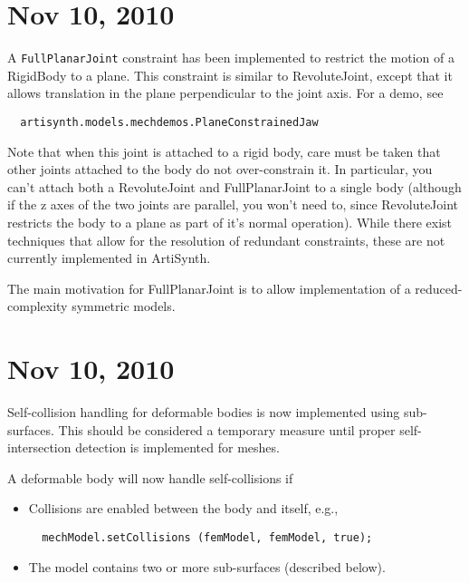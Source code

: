 \documentclass{article}
\begin{document}
\section*{Nov 10, 2010}

A {\tt FullPlanarJoint} constraint has been implemented to restrict the
motion of a RigidBody to a plane. This constraint is similar to
RevoluteJoint, except that it allows translation in the plane
perpendicular to the joint axis. For a demo, see

\begin{verbatim}
  artisynth.models.mechdemos.PlaneConstrainedJaw
\end{verbatim}

Note that when this joint is attached to a rigid body, care must be
taken that other joints attached to the body do not over-constrain it.
In particular, you can't attach both a RevoluteJoint and
FullPlanarJoint to a single body (although if the z axes of the
two joints are parallel, you won't need to, since RevoluteJoint
restricts the body to a plane as part of it's normal operation).
While there exist techniques that allow for the resolution of
redundant constraints, these are not currently implemented in
ArtiSynth.

The main motivation for FullPlanarJoint is to allow
implementation of a reduced-complexity symmetric models.

\section*{Nov 10, 2010}

Self-collision handling for deformable bodies is now implemented using
sub-surfaces. This should be considered a temporary measure until proper
self-intersection detection is implemented for meshes.

A deformable body will now handle self-collisions if

\begin{itemize}

\item Collisions are enabled between the body and itself, e.g.,

\begin{verbatim}
  mechModel.setCollisions (femModel, femModel, true);
\end{verbatim}

\item The model contains two or more sub-surfaces (described below).

\end{itemize}
\end{document}
